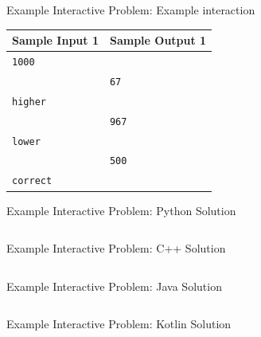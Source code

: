 \documentclass[11pt,pdf, aspectratio=169]{beamer}
\begin{document}
  \begin{frame}{Example Interactive Problem: Example interaction}
    \begin{tabular}{|l|l|}
      \hline
      \textbf{Sample Input 1} & \textbf{Sample Output 1} \\
      \hline
      \texttt{1000}           &                          \\
      & \texttt{67}              \\
      \texttt{higher}         &                          \\
      & \texttt{967}             \\
      \texttt{lower}          &                          \\
      & \texttt{500}             \\
      \texttt{correct}        &                          \\
      \hline
    \end{tabular}
  \end{frame}

  \begin{frame}[containsverbatim]{Example Interactive Problem: Python Solution}
    \inputminted{python}{code/session-1/python/interactive-example.py}
  \end{frame}
  \begin{frame}[containsverbatim]{Example Interactive Problem: C++ Solution}
    \inputminted[fontsize=\tiny]{c++}{code/session-1/c++/interactive-example.cpp}
  \end{frame}
  \begin{frame}[containsverbatim]{Example Interactive Problem: Java Solution}
    \inputminted[fontsize=\tiny]{java}{code/session-1/java/InteractiveExample.java}
  \end{frame}
  \begin{frame}[containsverbatim]{Example Interactive Problem: Kotlin Solution}
    \inputminted{kotlin}{code/session-1/kotlin/interactive-example.kt}
  \end{frame}
\end{document}
